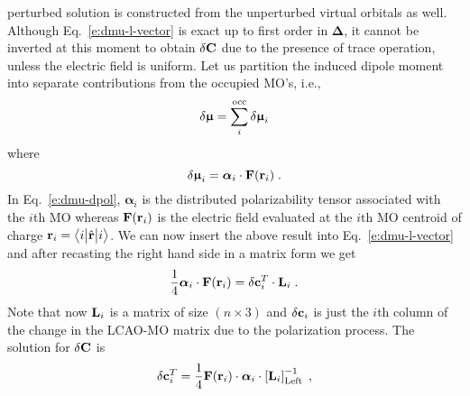 \documentclass[aip,amsmath,amssymb,reprint]{revtex4-1}
\newcommand{\tbraket}[3]{\ensuremath{\bigl\langle {#1} \bigl\lvert {#2} \bigl\lvert {#3} \bigr\rangle}}
\newcommand{\BM}[1]{\bm{#1}}
\begin{document}
perturbed solution is constructed from the unperturbed virtual orbitals as well.
Although Eq.~\eqref{e:dmu-l-vector}
is exact up to first order in ${\BM\Delta}$, it cannot be inverted at this moment to obtain $\delta {\bf C}$
due to the presence of trace operation, unless the electric field is uniform.
Let us partition the induced dipole moment into separate contributions
from the occupied MO's, i.e.,
%
\begin{equation} \label{e:dmu-part}
 \delta {\BM{\upmu}} = \sum_i^{\rm occ} \delta {\BM{\upmu}}_i
\end{equation}
%
where
%
\begin{equation} \label{e:dmu-dpol}
 \delta {\BM{\upmu}}_i = {\BM{\alpha}}_i \cdot {\bf F}({\bf r}_i) \;.
\end{equation}
%
In Eq.~\eqref{e:dmu-dpol}, ${\BM{\alpha}}_i$ is the distributed polarizability tensor
associated with the $i$th MO whereas ${\bf F}({\bf r}_i)$ is the electric field evaluated at the $i$th MO centroid of charge
${\bf r}_i = \tbraket{i}{\hat{\bf r}}{i}$.
We can now insert the above result into Eq.~\eqref{e:dmu-l-vector} 
and after recasting the right hand side in a matrix form
we get
%
\begin{equation} \label{e:dmu-l-vector-mo-transform-X}
 \frac{1}{4} {\BM{\alpha}}_i \cdot {\bf F}({\bf r}_i) 
   =
   \delta {\bf c}_i^T \cdot {\bf L}_i \;.
\end{equation}
%
Note that now ${\bf L}_i$ is a matrix of size $(n \times 3)$ and $\delta{\bf c}_i$ is just the $i$th column of the
change in the LCAO-MO matrix due to the polarization process.
%
%
The solution for $\delta {\bf C}$ is
%
\begin{equation} \label{e:mu-ind.matrix.linear.solution}
  \delta {\bf c}_i^T = \frac{1}{4}
            {\bf F}({\bf r}_i)  \cdot {\BM{\alpha}}_i \cdot 
                    \left[ {\bf L}_i  \right]^{-1}_{\rm Left} \;,
\end{equation}
\end{document}
